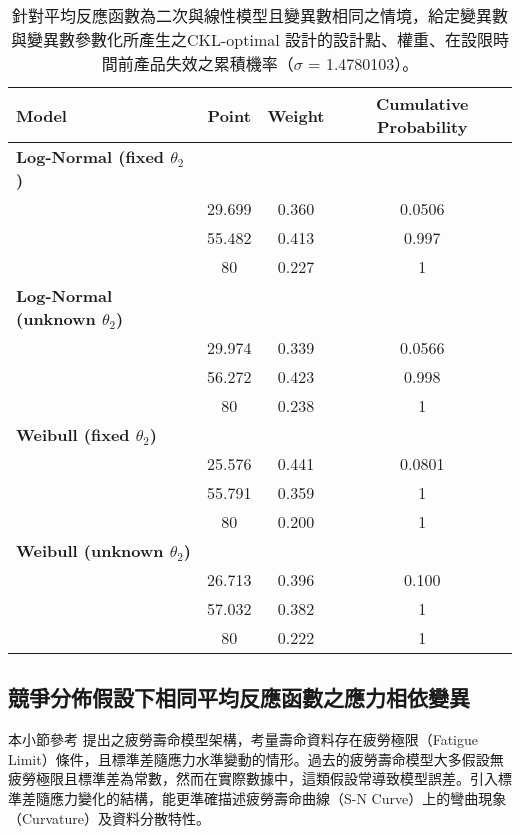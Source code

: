 \begin{table}[H] \scriptsize
\caption{針對平均反應函數為二次與線性模型且變異數相同之情境，給定變異數與變異數參數化所產生之CKL-optimal 設計的設計點、權重、在設限時間前產品失效之累積機率（$\sigma$ = 1.4780103）。}
\label{tab:design_comparison1.48}
\centering
\renewcommand{\arraystretch}{1.3}
\begin{tabular}{lccc}
\toprule
\textbf{Model} & \textbf{Point} & \textbf{Weight} & \textbf{Cumulative Probability} \\
\midrule
\textbf{Log-Normal (fixed $\theta_2$)} & & & \\
\quad & 29.699 & 0.360 & 0.0506 \\
\quad & 55.482 & 0.413 & 0.997 \\
\quad & 80 & 0.227 & 1 \\
\addlinespace
\textbf{Log-Normal (unknown $\theta_2$)} & & & \\
\quad & 29.974 & 0.339 & 0.0566 \\
\quad & 56.272 & 0.423 & 0.998 \\
\quad & 80 & 0.238 & 1 \\
\addlinespace
\textbf{Weibull (fixed $\theta_2$)} & & & \\
\quad & 25.576 & 0.441 & 0.0801 \\
\quad & 55.791 & 0.359 & 1 \\
\quad & 80 & 0.200 & 1 \\
\addlinespace
\textbf{Weibull (unknown $\theta_2$)} & & & \\
\quad & 26.713 & 0.396 & 0.100 \\
\quad & 57.032 & 0.382 & 1 \\
\quad & 80 & 0.222 & 1 \\
\bottomrule
\end{tabular}
\end{table}

\subsection{競爭分佈假設下相同平均反應函數之應力相依變異}\label{SEC:Meeker}

\hspace*{8mm} 本小節參考 \cite{pascual1997analysis} 提出之疲勞壽命模型架構，考量壽命資料存在疲勞極限（Fatigue Limit）條件，且標準差隨應力水準變動的情形。過去的疲勞壽命模型大多假設無疲勞極限且標準差為常數，然而在實際數據中，這類假設常導致模型誤差。引入標準差隨應力變化的結構，能更準確描述疲勞壽命曲線（S-N Curve）上的彎曲現象（Curvature）及資料分散特性。

